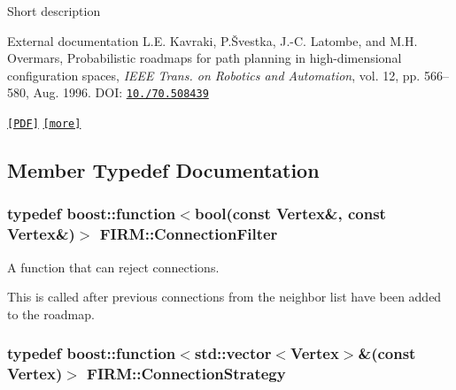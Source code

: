 \label{class_f_i_r_m_FIRM}%
\hypertarget{class_f_i_r_m_FIRM}{}%
 \begin{DoxyParagraph}{\-Short description}

\end{DoxyParagraph}
\begin{DoxyParagraph}{\-External documentation}
\-L.\-E. \-Kavraki, \-P.\-Švestka, \-J.-\/\-C. \-Latombe, and \-M.\-H. \-Overmars, \-Probabilistic roadmaps for path planning in high-\/dimensional configuration spaces, {\itshape \-I\-E\-E\-E \-Trans. on \-Robotics and \-Automation\/}, vol. 12, pp. 566–580, \-Aug. 1996. \-D\-O\-I\-: \href{http://dx.doi.org/10.1109/70.508439}{\tt 10./70.508439}\par
 \href{http://ieeexplore.ieee.org/ielx4/70/11078/00508439.pdf?tp=&arnumber=508439&isnumber=11078}{\tt \mbox{[}\-P\-D\-F\mbox{]}} \href{http://www.kavrakilab.org/robotics/prm.html}{\tt \mbox{[}more\mbox{]}} 
\end{DoxyParagraph}


\subsection{\-Member \-Typedef \-Documentation}
\hypertarget{class_f_i_r_m_a2482eee2e5248d5bff3b3b56e5a593b3}{
\subsubsection[{\-Connection\-Filter}]{\setlength{\rightskip}{0pt plus 5cm}typedef boost\-::function$<$bool(const \-Vertex\&, const \-Vertex\&)$>$ {\bf \-F\-I\-R\-M\-::\-Connection\-Filter}}}\label{class_f_i_r_m_a2482eee2e5248d5bff3b3b56e5a593b3}


\-A function that can reject connections. 

\-This is called after previous connections from the neighbor list have been added to the roadmap. \hypertarget{class_f_i_r_m_a15cfbcaf52c0bdd5e6c1a969bbf7ea1e}{
\subsubsection[{\-Connection\-Strategy}]{\setlength{\rightskip}{0pt plus 5cm}typedef boost\-::function$<$std\-::vector$<$\-Vertex$>$\&(const \-Vertex)$>$ {\bf \-F\-I\-R\-M\-::\-Connection\-Strategy}}}\label{class_f_i_r_m_a15cfbcaf52c0bdd5e6c1a969bbf7ea1e}


